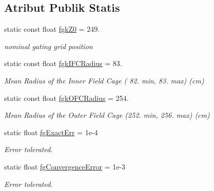 \subsection*{Atribut Publik Statis}
\begin{DoxyCompactItemize}
\item 
\hypertarget{classPoissonSolver3DCylindricalGPU_a5eb3632a6ebb4d201f78283bb6836619}{}\label{classPoissonSolver3DCylindricalGPU_a5eb3632a6ebb4d201f78283bb6836619} 
static const float \hyperlink{classPoissonSolver3DCylindricalGPU_a5eb3632a6ebb4d201f78283bb6836619}{fgk\+Z0} = 249.
\begin{DoxyCompactList}\small\item\em nominal gating grid position \end{DoxyCompactList}\item 
static const float \hyperlink{classPoissonSolver3DCylindricalGPU_a6688ba03a837d4919001cd0aa14ef80e}{fgk\+I\+F\+C\+Radius} = 83.
\begin{DoxyCompactList}\small\item\em Mean Radius of the Inner Field Cage ( 82. min, 83. max) (cm) \end{DoxyCompactList}\item 
\hypertarget{classPoissonSolver3DCylindricalGPU_ac7da41dc5ec3589d855ae7569f34734d}{}\label{classPoissonSolver3DCylindricalGPU_ac7da41dc5ec3589d855ae7569f34734d} 
static const float \hyperlink{classPoissonSolver3DCylindricalGPU_ac7da41dc5ec3589d855ae7569f34734d}{fgk\+O\+F\+C\+Radius} = 254.
\begin{DoxyCompactList}\small\item\em Mean Radius of the Outer Field Cage (252. min, 256. max) (cm) \end{DoxyCompactList}\item 
\hypertarget{classPoissonSolver3DCylindricalGPU_aec3b2f7c092a1f94cc13d1e9c2d9ecaf}{}\label{classPoissonSolver3DCylindricalGPU_aec3b2f7c092a1f94cc13d1e9c2d9ecaf} 
static float \hyperlink{classPoissonSolver3DCylindricalGPU_aec3b2f7c092a1f94cc13d1e9c2d9ecaf}{fg\+Exact\+Err} = 1e-\/4
\begin{DoxyCompactList}\small\item\em Error tolerated. \end{DoxyCompactList}\item 
\hypertarget{classPoissonSolver3DCylindricalGPU_aa4ca52e88fafce30176d4cae5af7f6d9}{}\label{classPoissonSolver3DCylindricalGPU_aa4ca52e88fafce30176d4cae5af7f6d9} 
static float \hyperlink{classPoissonSolver3DCylindricalGPU_aa4ca52e88fafce30176d4cae5af7f6d9}{fg\+Convergence\+Error} = 1e-\/3
\begin{DoxyCompactList}\small\item\em Error tolerated. \end{DoxyCompactList}\end{DoxyCompactItemize}


